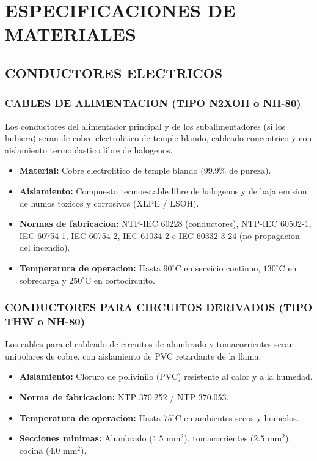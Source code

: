 \chapter*{ESPECIFICACIONES DE MATERIALES}

\iffalse

\section{CONDUCTORES ELECTRICOS}

\subsection{CABLES DE ALIMENTACION (TIPO N2XOH o NH-80)}
Los conductores del alimentador principal y de los subalimentadores (si los hubiera) seran de cobre electrolitico de temple blando, cableado concentrico y con aislamiento termoplastico libre de halogenos.
\begin{itemize}
  \item \textbf{Material:} Cobre electrolitico de temple blando (99.9\% de pureza).
  \item \textbf{Aislamiento:} Compuesto termoestable libre de halogenos y de baja emision de humos toxicos y corrosivos (XLPE / LSOH).
  \item \textbf{Normas de fabricacion:} NTP-IEC 60228 (conductores), NTP-IEC 60502-1, IEC 60754-1, IEC 60754-2, IEC 61034-2 e IEC 60332-3-24 (no propagacion del incendio).
  \item \textbf{Temperatura de operacion:} Hasta \(90^\circ\text{C}\) en servicio continuo, \(130^\circ\text{C}\) en sobrecarga y \(250^\circ\text{C}\) en cortocircuito.
\end{itemize}

\subsection{CONDUCTORES PARA CIRCUITOS DERIVADOS (TIPO THW o NH-80)}
Los cables para el cableado de circuitos de alumbrado y tomacorrientes seran unipolares de cobre, con aislamiento de PVC retardante de la llama.
\begin{itemize}
  \item \textbf{Aislamiento:} Cloruro de polivinilo (PVC) resistente al calor y a la humedad.
  \item \textbf{Norma de fabricacion:} NTP 370.252 / NTP 370.053.
  \item \textbf{Temperatura de operacion:} Hasta \(75^\circ\text{C}\) en ambientes secos y humedos.
  \item \textbf{Secciones minimas:} Alumbrado (\(1.5\text{ mm}^2\)), tomacorrientes (\(2.5\text{ mm}^2\)), cocina (\(4.0\text{ mm}^2\)).
\end{itemize}


